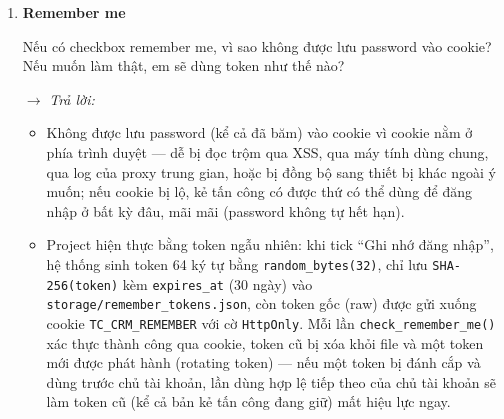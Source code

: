 \begin{enumerate}[label = \textbf{\arabic*.}, leftmargin=*]
    \begin{itemize}[leftmargin = 0.55cm, label = $\bullet$]
        \item \texttt{AuthController::logout()} xóa toàn bộ dữ liệu trong \texttt{\$\_SESSION}, gọi \texttt{session\_destroy()}, đồng thời xóa cookie remember-token (\texttt{clear\_remember\_token()}) nếu có, rồi redirect về \texttt{/login} kèm flash xác nhận — không chỉ đơn thuần unset biến \texttt{user\_id}.
        \item Timeout được kiểm tra ở đầu mọi request qua \texttt{check\_session\_timeout()}: so sánh \texttt{time() - \$\_SESSION['last\_activity\_at']} với ngưỡng \texttt{SESSION\_IDLE\_LIMIT} (mặc định 900 giây = 15 phút); nếu vượt ngưỡng, session bị hủy và người dùng bị đưa về \texttt{/login}; nếu chưa vượt, \texttt{last\_activity\_at} được cập nhật lại theo request hiện tại.
        \item \texttt{HttpOnly} ngăn JavaScript (kể cả JavaScript độc hại chèn qua lỗ hổng XSS) đọc được cookie session, giảm rủi ro đánh cắp session qua XSS. \texttt{SameSite=Lax} khiến trình duyệt không tự động gửi cookie session khi request POST được khởi tạo từ một trang khác domain, giảm rủi ro CSRF. \texttt{Secure} (bật động theo \texttt{\$isHttps}) đảm bảo cookie chỉ được gửi qua kết nối HTTPS, tránh bị đánh cắp khi truyền qua mạng không mã hóa.
    \end{itemize}

    \item \textbf{Remember me}

    Nếu có checkbox remember me, vì sao không được lưu password vào cookie? Nếu muốn làm thật, em sẽ dùng token như thế nào?

    \hspace*{-0.6cm} $\rightarrow$ \textit{Trả lời:}

    \begin{itemize}[leftmargin = 0.55cm, label = $\bullet$]
        \item Không được lưu password (kể cả đã băm) vào cookie vì cookie nằm ở phía trình duyệt — dễ bị đọc trộm qua XSS, qua máy tính dùng chung, qua log của proxy trung gian, hoặc bị đồng bộ sang thiết bị khác ngoài ý muốn; nếu cookie bị lộ, kẻ tấn công có được thứ có thể dùng để đăng nhập ở bất kỳ đâu, mãi mãi (password không tự hết hạn).
        \item Project hiện thực bằng token ngẫu nhiên: khi tick ``Ghi nhớ đăng nhập'', hệ thống sinh token 64 ký tự bằng \texttt{random\_bytes(32)}, chỉ lưu \texttt{SHA-256(token)} kèm \texttt{expires\_at} (30 ngày) vào \texttt{storage/remember\_tokens.json}, còn token gốc (raw) được gửi xuống cookie \texttt{TC\_CRM\_REMEMBER} với cờ \texttt{HttpOnly}. Mỗi lần \texttt{check\_remember\_me()} xác thực thành công qua cookie, token cũ bị xóa khỏi file và một token mới được phát hành (rotating token) — nếu một token bị đánh cắp và dùng trước chủ tài khoản, lần dùng hợp lệ tiếp theo của chủ tài khoản sẽ làm token cũ (kể cả bản kẻ tấn công đang giữ) mất hiệu lực ngay.
    \end{itemize}


\end{enumerate}

